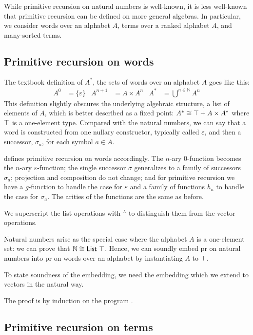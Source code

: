 \documentclass{jfp}
\newcommand\Nat{\ensuremath{\mathbb{N}}}
\begin{document}
While primitive recursion on natural numbers is well-known, it is less
well-known that primitive recursion can be defined on more general
algebras. In particular, we consider words over an alphabet $A$, terms
over a ranked alphabet $A$, and many-sorted terms. 

\subsection{Primitive recursion on words}
\label{sec:prim-recurs-words}

The textbook definition of $A^*$, the sets of words over an alphabet $A$ goes like this:
\begin{align*}
  A^0 &= \{ \varepsilon \} & A^{n+1} &= A \times A^n & A^* &=
  \bigcup^{n \in ℕ} A^n
\end{align*}
This definition slightly obscures the underlying algebraic structure, a list of
elements of $A$, which is better described as a fixed point:
$A^*\cong \ATop + A \times A^*$ where $\ATop$ is a one-element type.
Compared with the natural numbers, we can say that a word is
constructed from one nullary constructor, typically called
$\varepsilon$, and then a successor, $\sigma_a$, for each symbol $a\in A$.

\citet{peter35:_uber_zusam_begrif_funkt} defines primitive recursion on words
accordingly. The $n$-ary $0$-function becomes the $n$-ary
$\varepsilon$-function; the single successor $\sigma$ generalizes to a
family of successors $\sigma_a$; projection and composition do not
change; and for primitive recursion we have a $g$-function to handle the
case for $\varepsilon$ and a family of functions $h_a$ to handle the
case for $\sigma_a$. The arities of the functions are the same as before.

\PRWords
We superscript the list operations with $^L$ to distinguish them from the vector operations.
\PRWordsEval

Natural numbers arise as the special case where the alphabet $A$ is a
one-element set: we can prove that $\Nat \cong \text{\AList\ATop}$. Hence, we
can soundly embed pr on natural numbers into pr on words over an
alphabet by instantiating $A$ to $\ATop$.

\PRNatsToWords
To state soundness of the embedding, we need the embedding
{\PRNatsToWordsEncoding} which we extend to vectors in the natural
way. 

\PRNatsToWordsSound
The proof is by induction on the program .


\subsection{Primitive recursion on terms}
\label{sec:prim-recurs-trees}

\end{document}
